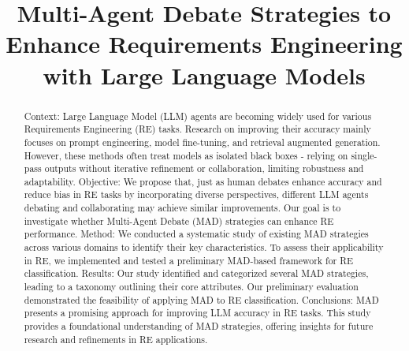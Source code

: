 \documentclass[conference]{IEEEtran}
\begin{document}
\title{Multi-Agent Debate Strategies to Enhance Requirements Engineering with Large Language Models\\
}

\author{
\and

\and

\and

}

\maketitle

\begin{abstract}
Context: Large Language Model (LLM) agents are becoming widely used for various Requirements Engineering (RE) tasks. Research on improving their accuracy mainly focuses on prompt engineering, model fine-tuning, and retrieval augmented generation. However, these methods often treat models as isolated black boxes - relying on single-pass outputs without iterative refinement or collaboration, limiting robustness and adaptability.
Objective: We propose that, just as human debates enhance accuracy and reduce bias in RE tasks by incorporating diverse perspectives, different LLM agents debating and collaborating may achieve similar improvements. Our goal is to investigate whether Multi-Agent Debate (MAD) strategies can enhance RE performance.
Method: We conducted a systematic study of existing MAD strategies across various domains to identify their key characteristics. To assess their applicability in RE, we implemented and tested a preliminary MAD-based framework for RE classification.
Results: Our study identified and categorized several MAD strategies, leading to a taxonomy outlining their core attributes. Our preliminary evaluation demonstrated the feasibility of applying MAD to RE classification.
Conclusions: MAD presents a promising approach for improving LLM accuracy in RE tasks. This study provides a foundational understanding of MAD strategies, offering insights for future research and refinements in RE applications.
\end{abstract}
\end{document}
